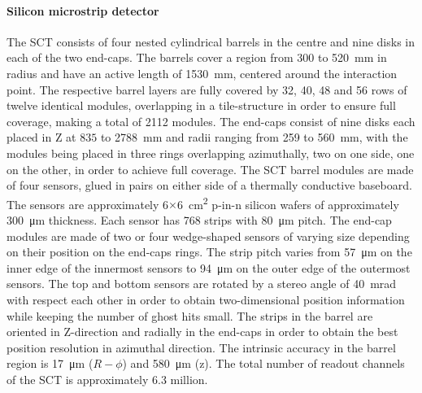 \paragraph{Silicon microstrip detector}
The SCT\cite{atlas_sct} consists of four nested cylindrical barrels in the centre and nine disks in each of the two end-caps. The barrels cover a region from 300 to \SI{520}{\milli\meter} in radius and have an active length of \SI{1530}{\milli\meter}, centered around the interaction point. The respective barrel layers are fully covered by 32, 40, 48 and 56 rows of twelve identical modules, overlapping in a tile-structure in order to ensure full coverage, making a total of 2112 modules. The end-caps consist of nine disks each placed in Z at $835$ to \SI{2788}{\milli\meter} and radii ranging from 259 to \SI{560}{\milli\meter}, with the modules being placed in three rings overlapping azimuthally, two on one side, one on the other, in order to achieve full coverage.
The SCT barrel modules are made of four sensors, glued in pairs on either side of a thermally conductive baseboard. The sensors are approximately 6$\times$\SI{6}{\square\centi\meter} p-in-n silicon wafers of approximately \SI{300}{\micro\meter} thickness. Each sensor has 768 strips with \SI{80}{\micro\meter} pitch. The end-cap modules are made of two or four wedge-shaped sensors of varying size depending on their position on the end-caps rings. The strip pitch varies from \SI{57}{\micro\meter} on the inner edge of the innermost sensors to \SI{94}{\micro \meter} on the outer edge of the outermost sensors. The top and bottom sensors are rotated by a stereo angle of \SI{40}{\milli\radian} with respect each other in order to obtain two-dimensional position information while keeping the number of ghost hits small. The strips in the barrel are oriented in Z-direction and radially in the end-caps in order to obtain the best position resolution in azimuthal direction.
 The intrinsic accuracy in the barrel region is \SI{17}{\micro\meter} ($R-\phi$) and \SI{580}{\micro\meter} (z). The total number of readout channels of the SCT is approximately 6.3 million.

